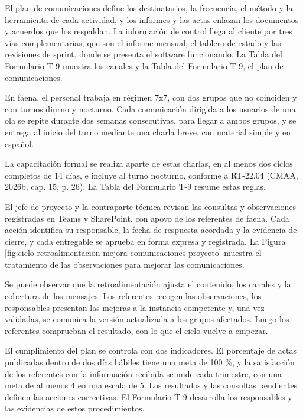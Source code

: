 \documentclass[subdoc]{../../comun/overfore}
\begin{document}
El plan de comunicaciones define los destinatarios, la frecuencia, el método y la herramienta de cada actividad, y los informes y las actas enlazan los documentos y acuerdos que los respaldan. La información de control llega al cliente por tres vías complementarias, que son el informe mensual, el tablero de estado y las revisiones de sprint, donde se presenta el software funcionando. La Tabla  del Formulario T-9 muestra los canales y la Tabla  del Formulario T-9, el plan de comunicaciones.

En faena, el personal trabaja en régimen 7x7, con dos grupos que no coinciden y con turnos diurno y nocturno. Cada comunicación dirigida a los usuarios de una ola se repite durante dos semanas consecutivas, para llegar a ambos grupos, y se entrega al inicio del turno mediante una charla breve, con material simple y en español.

La capacitación formal se realiza aparte de estas charlas, en al menos dos ciclos completos de 14 días, e incluye al turno nocturno, conforme a RT-22.04 (CMAA, 2026b, cap. 15, p. 26). La Tabla  del Formulario T-9 resume estas reglas.

El jefe de proyecto y la contraparte técnica revisan las consultas y observaciones registradas en Teams y SharePoint, con apoyo de los referentes de faena. Cada acción identifica su responsable, la fecha de respuesta acordada y la evidencia de cierre, y cada entregable se aprueba en forma expresa y registrada. La Figura \ref{fig:ciclo-retroalimentacion-mejora-comunicaciones-proyecto} muestra el tratamiento de las observaciones para mejorar las comunicaciones.

Se puede observar que la retroalimentación ajusta el contenido, los canales y la cobertura de los mensajes. Los referentes recogen las observaciones, los responsables presentan las mejoras a la instancia competente y, una vez validadas, se comunica la versión actualizada a los grupos afectados. Luego los referentes comprueban el resultado, con lo que el ciclo vuelve a empezar.

El cumplimiento del plan se controla con dos indicadores. El porcentaje de actas publicadas dentro de dos días hábiles tiene una meta de 100 \%, y la satisfacción de los referentes con la información recibida se mide cada trimestre, con una meta de al menos 4 en una escala de 5. Los resultados y las consultas pendientes definen las acciones correctivas. El Formulario T-9 desarrolla los responsables y las evidencias de estos procedimientos.
\end{document}
